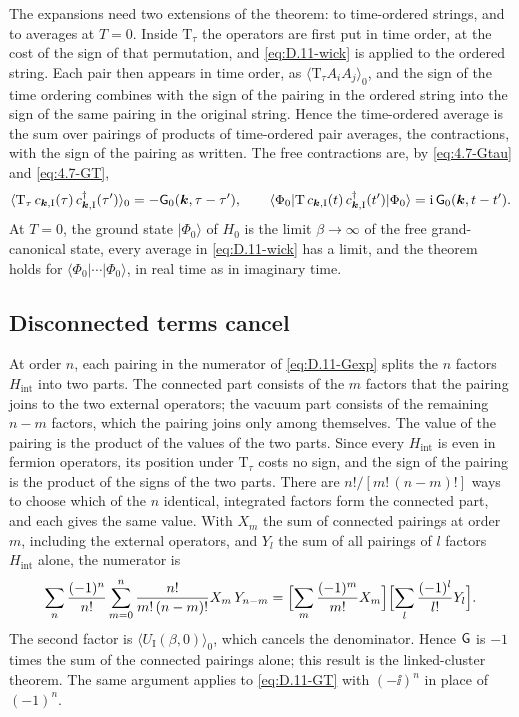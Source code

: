 The expansions need two extensions of the theorem: to time-ordered strings, and to averages at $T = 0$. Inside $\mathrm{T}_\tau$ the operators are first put in time order, at the cost of the sign of that permutation, and \cref{eq:D.11-wick} is applied to the ordered string. Each pair then appears in time order, as $\langle\mathrm{T}_\tau A_iA_j\rangle_0$, and the sign of the time ordering combines with the sign of the pairing in the ordered string into the sign of the same pairing in the original string. Hence the time-ordered average is the sum over pairings of products of time-ordered pair averages, the contractions, with the sign of the pairing as written. The free contractions are, by \cref{eq:4.7-Gtau} and \cref{eq:4.7-GT},
\begin{equation}
  \langle\mathrm{T}_\tau\,c_{\bm{k},\mathrm{I}}(\tau)\,c^\dagger_{\bm{k},\mathrm{I}}(\tau')\rangle_0 = -\mathsf{G}_0(\bm{k},\tau - \tau'), \qquad
  \langle\Phi_0|\mathrm{T}\,c_{\bm{k},\mathrm{I}}(t)\,c^\dagger_{\bm{k},\mathrm{I}}(t')|\Phi_0\rangle = \mathrm{i}\,\mathsf{G}_0(\bm{k},t - t') .
  \label{eq:D.11-contract}
\end{equation}
At $T = 0$, the ground state $|\Phi_0\rangle$ of $H_0$ is the limit $\beta \to \infty$ of the free grand-canonical state, every average in \cref{eq:D.11-wick} has a limit, and the theorem holds for $\langle\Phi_0|\cdots|\Phi_0\rangle$, in real time as in imaginary time.

\subsection*{Disconnected terms cancel}

At order $n$, each pairing in the numerator of \cref{eq:D.11-Gexp} splits the $n$ factors $H_{\mathrm{int}}$ into two parts. The connected part consists of the $m$ factors that the pairing joins to the two external operators; the vacuum part consists of the remaining $n - m$ factors, which the pairing joins only among themselves. The value of the pairing is the product of the values of the two parts. Since every $H_{\mathrm{int}}$ is even in fermion operators, its position under $\mathrm{T}_\tau$ costs no sign, and the sign of the pairing is the product of the signs of the two parts. There are $n!/[m!\,(n - m)!]$ ways to choose which of the $n$ identical, integrated factors form the connected part, and each gives the same value. With $X_m$ the sum of connected pairings at order $m$, including the external operators, and $Y_l$ the sum of all pairings of $l$ factors $H_{\mathrm{int}}$ alone, the numerator is
\begin{equation*}
  \sum_n\frac{(-1)^n}{n!}\sum_{m=0}^n\frac{n!}{m!\,(n - m)!}X_m\,Y_{n-m}
  = \Bigl[\sum_m\frac{(-1)^m}{m!}X_m\Bigr]\Bigl[\sum_l\frac{(-1)^l}{l!}Y_l\Bigr] .
\end{equation*}
The second factor is $\langle U_{\mathrm{I}}(\beta,0)\rangle_0$, which cancels the denominator. Hence $\mathsf{G}$ is $-1$ times the sum of the connected pairings alone; this result is the linked-cluster theorem. The same argument applies to \cref{eq:D.11-GT} with $(-\ii)^n$ in place of $(-1)^n$.

